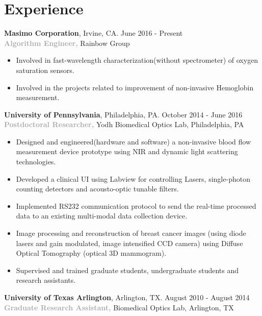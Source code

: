 \documentclass{my_cv}
\begin{document}
\section{Experience}
\begin{flushleft}  

\textbf{Masimo Corporation}, Irvine, CA. \hfill June 2016  - Present\\ 
\textbf{\textcolor{darkgray}{Algorithm Engineer,} }Rainbow Group
\begin{itemize} 
\item Involved in fast-wavelength characterization(without spectrometer) of oxygen saturation sensors.
\item Involved in the projects related to improvement of non-invasive Hemoglobin measurement.
\end{itemize} 
\vspace{5pt} 

\textbf{University of Pennsylvania}, Philadelphia, PA. \hfill October 2014 - June 2016 \\ 
\textbf{\textcolor{darkgray}{Postdoctoral Researcher,} }Yodh Biomedical Optics Lab, Philadelphia, PA

\begin{itemize} 
\item Designed and engineered(hardware and software) a non-invasive blood flow measurement device prototype using NIR and dynamic light scattering technologies.
\item Developed a clinical UI using Labview for controlling Lasers, single-photon counting detectors and acousto-optic tunable filters.  
\item Implemented RS232 communication protocol to send the real-time processed data to an existing multi-modal data collection device.  
\item Image processing and reconstruction of breast cancer images (using diode lasers and gain modulated, image intensified CCD camera) using Diffuse Optical Tomography (optical 3D mammogram).
\item Supervised and trained graduate students, undergraduate students and research assistants.  
\end{itemize}
\vspace{5pt} 
\textbf{University of Texas Arlington}, Arlington, TX. \hfill August 2010 - August 2014 \\
\textbf{\textcolor{darkgray}{Graduate Research Assistant,} }Biomedical Optics Lab, Arlington, TX 
\begin{itemize} 


\end{itemize}
\end{flushleft}
\end{document}
